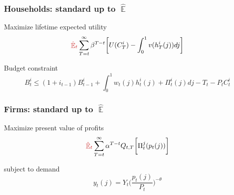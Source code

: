 \documentclass[11pt]{beamer}
\DeclareMathOperator{\E}{\mathbb{E}}
\begin{document}
\begin{frame}
	\frametitle{Households: standard up to $\hat{\E}$}
	\label{HH}

Maximize lifetime expected utility
\begin{equation}
\textcolor{brownreddark}{\hat{\E}_t}\sum^{\infty}_{T=t}\beta^{T-t} \bigg[ U(C^i_T) - \int_0^1 v(h^i_T(j)) dj \bigg]
\label{lifetime_U}
\end{equation}	

Budget constraint
\begin{equation}
 B^i_t \leq (1+i_{t-1})B^i_{t-1} + \int_0^1 w_t(j)h^i_t(j) + \Pi_t^i(j)  dj-T_t -P_tC^i_t
 \label{BC}
\end{equation}



\vfill

\hfill \hyperlink{details_HHs_firms}{}
\end{frame}

\begin{frame}
	\frametitle{Firms: standard up to $\hat{\E}$}

Maximize present value of profits
\begin{equation}
\textcolor{brownreddark}{\hat{\E}_t}\sum^{\infty}_{T=t}\alpha^{T-t} Q_{t,T} \bigg[ \Pi^j_t(p_t(j))\bigg]
\label{lifetime_profits}
\end{equation}

subject to demand
\begin{equation}
y_t(j) = Y_t \bigg(\frac{p_t(j)}{P_t}\bigg)^{-\theta}
\end{equation}


\vfill

\hfill \hyperlink{details_HHs_firms}{}

\end{frame}
\end{document}
